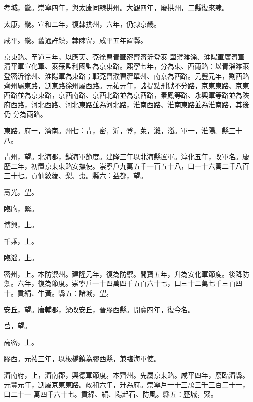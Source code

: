 \begin{pinyinscope}
 考城，畿。崇寧四年，與太康同隸拱州。大觀四年，廢拱州，二縣復來隸。



 太康，畿。宣和二年，復隸拱州，六年，仍隸京畿。



 咸平。畿。舊通許鎮，隸陳留，咸平五年置縣。



 京東路。至道三年，以應天、兗徐曹青鄆密齊濟沂登萊
 單濮濰淄、淮陽軍廣濟軍清平軍宣化軍、萊蕪監利國監為京東路。熙寧七年，分為東、西兩路：以青淄濰萊登密沂徐州、淮陽軍為東路；鄆兗齊濮曹濟單州、南京為西路。元豐元年，割西路齊州屬東路，割東路徐州屬西路。元祐元年，諸提點刑獄不分路，京東東路、京東西路並為京東路，京西南路、京西北路並為京西路，秦鳳等路、永興軍等路並為陜府西路，河北西路、河北東路並為河北路，淮南西路、淮南東路並為淮南路，其後仍
 分為兩路。



 東路。府一，濟南。州七：青，密，沂，登，萊，濰，淄。軍一，淮陽。縣三十八。



 青州，望。北海郡，鎮海軍節度。建隆三年以北海縣置軍。淳化五年，改軍名。慶歷二年，初置京東東路安撫使。崇寧戶九萬五千一百五十八，口一十六萬二千八百三十七。貢仙紋綾、梨、棗。縣六：益都，望。



 壽光，望。



 臨朐，緊。



 博興，上。



 千乘，上。



 臨淄。上。



 密州，上。本防禦州。建隆元年，復為防禦。開寶五年，升為安化軍節度。後降防禦。六年，復為節度。崇寧戶一十四萬四千五百六十七，口三十二萬七千三百四十。貢絹、牛黃。縣五：諸城，望。



 安丘，望。唐輔郡，梁改安丘，晉膠西縣。開寶四年，復今名。



 莒，望。



 高密，上。



 膠西。元祐三年，以板橋鎮為膠西縣，兼臨海軍使。



 濟南府，上，濟南郡，興德軍節度。本齊州。先屬京東路。咸平四年，廢臨濟縣。元豐元年，割屬京東東路。政和六年，升為府。崇寧戶一十三萬三千三百二十一，口二十一
 萬四千六十七。貢綿、絹、陽起石、防風。縣五：歷城，緊。




\end{pinyinscope}
